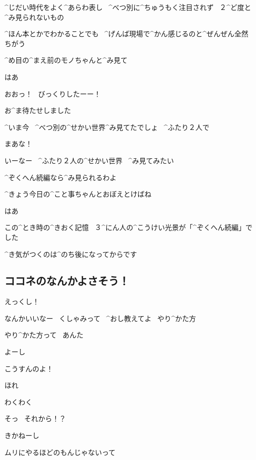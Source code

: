 \Ojisan ^{じだい}{時代}をよく^{あらわ}{表}し
\ ^{べつ}{別}に^{ちゅうもく}{注目}されず
\ ２^{ど}{度}と^{み}{見}られないもの

\page
\Sensei ^{ほん}{本}とかでわかることでも
\ ^{げんば}{現場}で^{かん}{感}じるのと^{ぜんぜん}{全然}ちがう

\Sensei ^{め}{目}の^{まえ}{前}のモノちゃんと^{み}{見}て

\page
\Ojisan はあ

\page
\Ojisan おおっ！
\ びっくりしたーー！

\Alpha お^{ま}{待}たせしました

\Alpha ^{いま}{今}
\ ^{べつ}{別}の^{せかい}{世界}^{み}{見}てたでしょ
\ ^{ふたり}{２人}で

\Ojisan まあな！

\page
\Alpha いーなー
\ ^{ふたり}{２人}の^{せかい}{世界}
\ ^{み}{見}てみたい

\Sensei ^{ぞくへん}{続編}なら^{み}{見}られるわよ

\Sensei ^{きょう}{今日}の^{こと}{事}ちゃんとおぼえとけばね

\Alpha はあ

\page
\Alpha この^{とき}{時}の^{きおく}{記憶}
\ ３^{にん}{人}の^{こうけい}{光景}が「^{ぞくへん}{続編}」でした

\Alpha ^{き}{気}がつくのは^{のち}{後}になってからです


\subsection{ココネのなんかよさそう！}

\Shiba えっくし！

\Kokone なんかいいなー
\ くしゃみって
\ ^{おし}{教}えてよ
\ やり^{かた}{方}

\Shiba やり^{かた}{方}って
\ あんた

\Shiba よーし

\Shiba こうすんのよ！

\Shiba ほれ

\Kokone わくわく

\Kokone そっ
\ それから！？

\Shiba きかねーし

\Shiba ムリにやるほどのもんじゃないって
